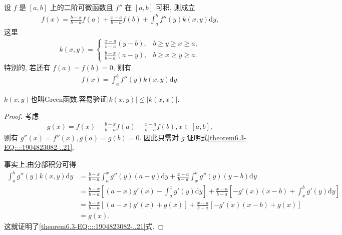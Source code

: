 \documentclass[../../main.tex]{subfiles}
\begin{document}
\begin{theorem}[带积分型余项的Lagrange插值公式]\label{theorem:带积分型余项的Lagrange插值公式}
设 $f$ 是 $[a,b]$ 上的二阶可微函数且 $f''$ 在 $[a,b]$ 可积, 则成立
\begin{align*}
f(x) = \frac{b-x}{b-a} f(a) + \frac{x-a}{b-a} f(b) + \int_{a}^{b} f''(y) k(x,y) \mathrm{d}y,
\end{align*}
这里
\begin{align*}
k(x,y) = 
\begin{cases}
\frac{x-a}{b-a} (y-b), & b \geqslant  y \geqslant  x \geqslant  a, \\
\frac{b-x}{b-a} (a-y), & b \geqslant  x \geqslant  y \geqslant  a.
\end{cases}
\end{align*}
特别的, 若还有 $f(a) = f(b) = 0$, 则有
\begin{align}
f(x) = \int_{a}^{b} f''(y) k(x,y) \mathrm{d}y.\label{theorem6.3-EQ::::1904823082-..21}
\end{align}
\end{theorem}
\begin{note}
$k(x,y)$也叫Green函数.容易验证$|k(x,y)|\leqslant  |k(x,x)|$.
\end{note}
\begin{proof}
考虑
\begin{align*}
g(x) = f(x) - \frac{b-x}{b-a} f(a) - \frac{x-a}{b-a} f(b), x \in [a,b],
\end{align*}
则有 $g''(x) = f''(x), g(a) = g(b) = 0$. 因此只需对 $g$ 证明式\eqref{theorem6.3-EQ::::1904823082-..21}.

事实上,由分部积分可得
\begin{align*}
\int_{a}^{b} g''(y) k(x,y) \mathrm{d}y &= \frac{b-x}{b-a} \int_{a}^{x} g''(y) (a-y) \mathrm{d}y + \frac{x-a}{b-a} \int_{x}^{b} g''(y) (y-b) \mathrm{d}y \\
&= \frac{b-x}{b-a} \left[ (a-x) g'(x) - \int_{a}^{x} g'(y) \mathrm{d}y \right] + \frac{x-a}{b-a} \left[ -g'(x) (x-b) + \int_{x}^{b} g'(y) \mathrm{d}y \right] \\
&= \frac{b-x}{b-a} [(a-x) g'(x) + g(x)] + \frac{x-a}{b-a} [-g'(x) (x-b) + g(x)] \\
&= g(x).
\end{align*}
这就证明了\eqref{theorem6.3-EQ::::1904823082-..21}式.

\end{proof}
\end{document}
